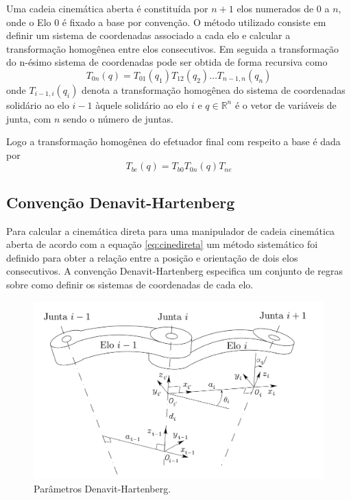 
Uma cadeia cinemática aberta é constituída por $n+1$ elos numerados de $0$ a $n$, onde o Elo 0 é fixado a base por convenção. O método utilizado consiste em definir um sistema de coordenadas associado a cada elo e calcular a transformação homogênea entre elos consecutivos. Em seguida a transformação do n-ésimo sistema de coordenadas pode ser obtida de forma recursiva como
\begin{equation}\label{eq:cinedireta}
{T}_{0n}({q}) = {T}_{01}(q_1) {T}_{12}(q_{2}) {\dots} {T}_{n-1,n}(q_n)
\end{equation}
onde ${T}_{i-1,i}(q_i)$ denota a transformação homogênea do sistema de coordenadas solidário ao elo $i-1$ àquele solidário ao elo $i$ e $q \in \mathbb{R}^n$ é o vetor de variáveis de junta, com $n$ sendo o número de juntas.

Logo a transformação homogênea do efetuador final com respeito a base é dada por
\begin{equation} \label{eq:base_efetuador}
{T}_{be}({q}) = {T}_{b0} {T}_{0n}({q}) {T}_{ne} 
\end{equation}

\subsection{Convenção Denavit-Hartenberg} \label{sec:denavit}
Para calcular a cinemática direta para uma manipulador de cadeia cinemática aberta de acordo com a equação \eqref{eq:cinedireta} um método sistemático foi definido para obter a relação entre a posição e orientação de dois elos consecutivos. A convenção Denavit-Hartenberg especifica um conjunto de regras sobre como definir os sistemas de coordenadas de cada elo.

\begin{figure}[!h]
  \centering
  \includegraphics[width=0.8\linewidth]{./img/dh_pt.png}
  \caption{Parâmetros Denavit-Hartenberg.}
  \label{fig:dh_pt}
\end{figure}

